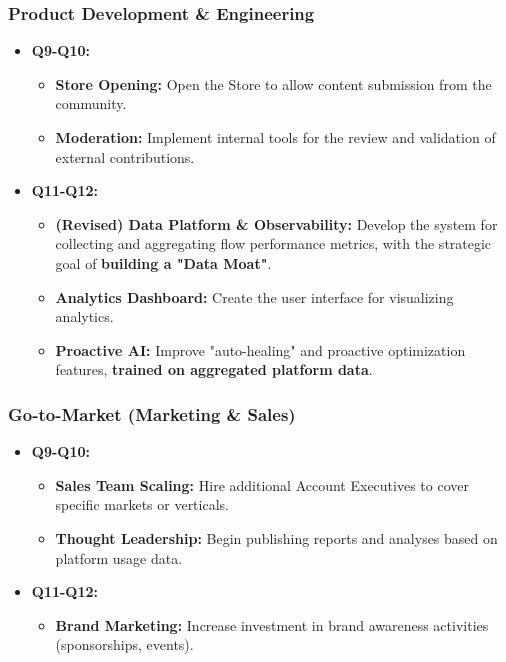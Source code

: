\subsubsection{Product Development \& Engineering}
\begin{itemize}[leftmargin=*]
    \item \textbf{Q9-Q10:}
    \begin{itemize}
        \item \textbf{Store Opening:} Open the Store to allow content submission from the community.
        \item \textbf{Moderation:} Implement internal tools for the review and validation of external contributions.
    \end{itemize}
    \item \textbf{Q11-Q12:}
    \begin{itemize}
        \item \textbf{(Revised) Data Platform \& Observability:} Develop the system for collecting and aggregating flow performance metrics, with the strategic goal of \textbf{building a "Data Moat"}.
        \item \textbf{Analytics Dashboard:} Create the user interface for visualizing analytics.
        \item \textbf{Proactive AI:} Improve "auto-healing" and proactive optimization features, \textbf{trained on aggregated platform data}.
    \end{itemize}
\end{itemize}

\subsubsection{Go-to-Market (Marketing \& Sales)}
\begin{itemize}[leftmargin=*]
    \item \textbf{Q9-Q10:}
    \begin{itemize}
        \item \textbf{Sales Team Scaling:} Hire additional Account Executives to cover specific markets or verticals.
        \item \textbf{Thought Leadership:} Begin publishing reports and analyses based on platform usage data.
    \end{itemize}
    \item \textbf{Q11-Q12:}
    \begin{itemize}
        \item \textbf{Brand Marketing:} Increase investment in brand awareness activities (sponsorships, events).
    \end{itemize}
\end{itemize}

